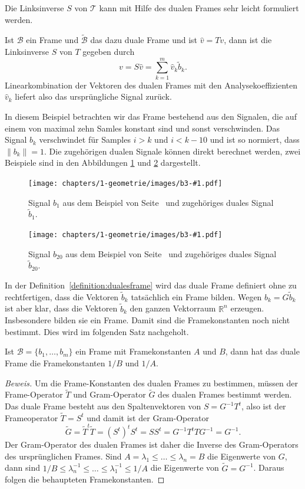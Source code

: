 Die Linksinverse $S$ von $\mathcal{T}$ kann mit Hilfe des dualen Frames
sehr leicht formuliert werden.

\begin{satz}
Ist $\mathcal{B}$ ein Frame und $\tilde{\mathcal{B}}$ das dazu duale
Frame und ist $\hat{v} = Tv$, dann ist die Linksinverse $S$ von $T$
gegeben durch
\[
v
=
S\hat{v}
=
\sum_{k=1}^m \hat{v}_k \tilde{b}_k.
\]
Linearkombination der Vektoren des dualen Frames mit den Analysekoeffizienten
$\hat{v}_k$ liefert also das ursprüngliche Signal zurück.
\end{satz}

\begin{beispiel}
\label{beispiel3}
In diesem Beispiel betrachten wir das Frame bestehend aus den
Signalen, die auf einem von maximal zehn Samles konstant sind
und sonst verschwinden.
Das Signal $b_k$ verschwindet für Samples $i>k$ und $i<k-10$
und ist so normiert, dass $\|b_k\|=1$.
Die zugehörigen dualen Signale können direkt berechnet werden,
zwei Beispiele sind in den Abbildungen \ref{b3-01} und \ref{b3-05}
dargestellt.
\def\beispieldrei#1#2{
\begin{figure}
\centering
\texttt{[image: chapters/1-geometrie/images/b3-\#1.pdf]}
\caption{Signal $b_{#2}$ aus dem Beispiel von Seite~\pageref{beispiel3}
und zugehöriges duales Signal $\tilde{b}_{#2}$.
\label{b3-#1}}
\end{figure}
}
\beispieldrei{01}{1}
\beispieldrei{05}{20}
\end{beispiel}

In der Definition~\ref{definition:dualesframe} wird das duale Frame
definiert ohne zu rechtfertigen, dass die Vektoren $\tilde{b}_k$ 
tatsächlich ein Frame bilden.
Wegen $b_k=G\tilde{b}_k$ ist aber klar, dass die Vektoren $\tilde{b}_k$
den ganzen Vektorraum $\mathbb R^n$ erzeugen.
Insbesondere bilden sie ein Frame.
Damit sind die Framekonstanten noch nicht bestimmt.
Dies wird im folgenden Satz nachgeholt.

\begin{satz}
Ist $\mathcal{B}=\{b_1,\dots,b_m\}$ ein Frame mit Framekonstanten
$A$ und $B$, dann hat das duale Frame die Framekonstanten $1/B$ und $1/A$.
\end{satz}

\begin{proof}[Beweis]
Um die Frame-Konstanten des dualen Frames zu bestimmen,
müssen der Frame-Operator $\tilde{T}$ und Gram-Operator $\tilde{G}$
des dualen Frames bestimmt werden.
Das duale Frame besteht aus den Spaltenvektoren von $S=G^{-1}T^t$,
also ist der Frameoperator $\tilde{T}=S^t$ und damit ist der Gram-Operator
\[
\tilde{G}
=
\tilde{T}^t\tilde{T}
=
(S^t)^tS^t
=
SS^t
=
G^{-1}T^tTG^{-1}
=
G^{-1}.
\]
Der Gram-Operator des dualen Frames ist daher die Inverse des
Gram-Operators des ursprünglichen Frames.
Sind $A=\lambda_1\le \dots\le \lambda_n=B$ die Eigenwerte  von $G$,
dann sind
$1/B\le \lambda_n^{-1} \le \dots \le \lambda_1^{-1}\le 1/A$ 
die Eigenwerte von $\tilde{G}=G^{-1}$.
Daraus folgen die behaupteten Framekonstanten.
\end{proof}

